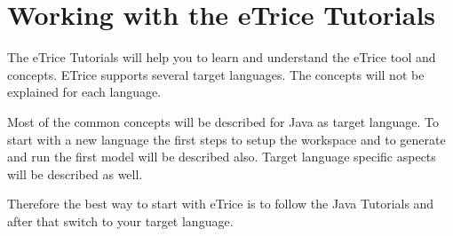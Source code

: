 \chapter{Working with the eTrice Tutorials}

The eTrice Tutorials will help you to learn and understand the eTrice tool and concepts. ETrice supports several target languages. The concepts will not be explained for each language. 

Most of the common concepts will be described for Java as target language. To start with a new language the first steps to setup the workspace and to generate and run the first model will be described also. Target language specific aspects will be described as well.

Therefore the best way to start with eTrice is to follow the Java Tutorials and after that switch to your target language.  
